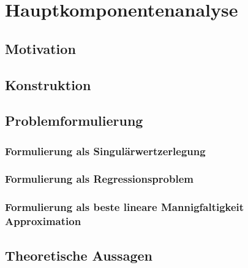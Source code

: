 \chapter{Hauptkomponentenanalyse}

\label{pca}

\section{Motivation}

\section{Konstruktion}

\section{Problemformulierung}
\subsection{Formulierung als Singulärwertzerlegung}
\subsection{Formulierung als Regressionsproblem}
\subsection{Formulierung als beste lineare Mannigfaltigkeit Approximation}

\section{Theoretische Aussagen}